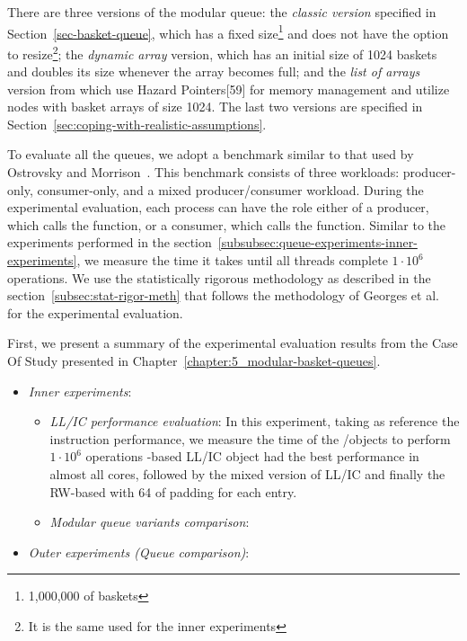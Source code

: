 There are three versions of the modular queue: the \textit{classic version} specified in Section~\ref{sec-basket-queue}, which has a fixed size\footnote{1,000,000 of baskets} and does not have the option to resize\footnote{It is the same used for the inner experiments}; the \textit{dynamic array} version, which has an initial size of 1024 baskets and doubles its size whenever the array becomes full; and the \textit{list of arrays} version from which use Hazard Pointers[59] for memory management and utilize nodes with basket arrays of size 1024. The last two versions are specified in Section~\ref{sec:coping-with-realistic-assumptions}.

To evaluate all the queues, we adopt a benchmark similar to that used by Ostrovsky and Morrison~\cite{scalingconcurrent2020}. This benchmark consists of three workloads: producer-only, consumer-only, and a mixed producer/consumer workload. During the experimental evaluation, each process can have the role either of a producer, which calls the \Enq function, or a consumer, which calls the \Deq function. Similar to the experiments performed in the section~\ref{subsubsec:queue-experiments-inner-experiments}, we measure the time it takes until all threads complete \(1\cdot 10^6\) operations. We use the statistically rigorous methodology as described in the section~\ref{subsec:stat-rigor-meth} that follows the methodology of Georges et al.~\cite{DBLP_conf_oopsla_GeorgesBE07} for the experimental evaluation.

First, we present a summary of the experimental evaluation results from the Case Of Study presented in Chapter~\ref{chapter:5_modular-basket-queues}.

\begin{itemize}
    \item \textit{Inner experiments}:
    \begin{itemize}
        \item  \textit{LL/IC performance evaluation}: In this experiment, taking as reference the \FAI instruction performance, we measure the time of the \LL/\IC objects to perform \(1\cdot 10^6\) operations \CAS-based LL/IC object had the best performance in almost all cores, followed by the mixed version of LL/IC and finally the RW-based with 64 of padding for each entry.
        \item \textit{Modular queue variants comparison}:
    \end{itemize}
    \item \textit{Outer experiments (Queue comparison)}:
\end{itemize}

